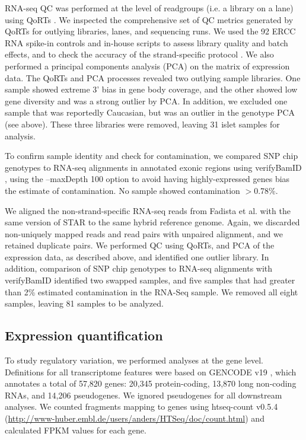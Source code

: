 RNA-seq QC was performed at the level of readgroups (i.e. a library on a lane) using QoRTs \cite{hartleyQoRTsComprehensiveToolset2015a}. We inspected the comprehensive set of QC metrics generated by QoRTs for outlying libraries, lanes, and sequencing runs. We used the 92 ERCC RNA spike-in controls and in-house scripts to assess library quality and batch effects, and to check the accuracy of the strand-specific protocol \cite{jiangSyntheticSpikeinStandards2011}. We also performed a principal components analysis (PCA) on the matrix of expression data. The QoRTs and PCA processes revealed two outlying sample libraries.  One sample showed extreme 3’ bias in gene body coverage, and the other showed low gene diversity and was a strong outlier by PCA. In addition, we excluded one sample that was reportedly Caucasian, but was an outlier in the genotype PCA (see above). These three libraries were removed, leaving 31 islet samples for analysis.

To confirm sample identity and check for contamination, we compared SNP chip genotypes to RNA-seq alignments in annotated exonic regions using verifyBamID \cite{junDetectingEstimatingContamination2012}, using the --maxDepth 100 option to avoid having highly-expressed genes bias the estimate of contamination. No sample showed contamination $>$0.78\%.

We aligned the non-strand-specific RNA-seq reads from Fadista et al. \cite{fadistaGlobalGenomicTranscriptomic2014} with the same version of STAR to the same hybrid reference genome. Again, we discarded non-uniquely mapped reads and read pairs with unpaired alignment, and we retained duplicate pairs. We performed QC using QoRTs, and PCA of the expression data, as described above, and identified one outlier library.  In addition, comparison of SNP chip genotypes to RNA-seq alignments with verifyBamID identified two swapped samples, and five samples that had greater than 2\% estimated contamination in the RNA-Seq sample. We removed all eight samples, leaving 81 samples to be analyzed.

\subsection{Expression quantification}
To study regulatory variation, we performed analyses at the gene level. Definitions for all transcriptome features were based on GENCODE v19 \cite{harrowGENCODEReferenceHuman2012}, which annotates a total of 57,820 genes: 20,345 protein-coding, 13,870 long non-coding RNAs, and 14,206 pseudogenes. We ignored pseudogenes for all downstream analyses. We counted fragments mapping to genes using htseq-count v0.5.4 \cite{andersHTSeqPythonFramework2015} (\url{http://www-huber.embl.de/users/anders/HTSeq/doc/count.html}) and calculated FPKM values for each gene. 

